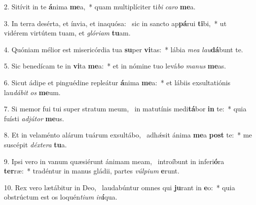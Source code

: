 2. Sitívit in te \textbf{á}nima \textbf{me}a,~*  quam multiplíciter ti\textit{bi} \textit{ca}\textit{ro} \textbf{me}a.\

3. In terra desérta, et ínvia, et inaquósa: \dag\  sic in sancto ap\textbf{pá}rui \textbf{ti}bi,~*  ut vidérem virtútem tuam, et \textit{gló}\textit{ri}\textit{am} \textbf{tu}am.\

4. Quóniam mélior est misericórdia tua \textbf{su}per \textbf{vi}tas:~*  lábia \textit{me}\textit{a} \textit{lau}\textbf{dá}bunt te.\

5. Sic benedícam te in \textbf{vi}ta \textbf{me}a:~*  et in nómine tuo levá\textit{bo} \textit{ma}\textit{nus} \textbf{me}as.\

6. Sicut ádipe et pinguédine repleátur \textbf{á}nima \textbf{me}a:~*  et lábiis exsultatiónis lau\textit{dá}\textit{bit} \textit{os} \textbf{me}um.\

7. Si memor fui tui super stratum meum, \dag\  in matutínis medi\textbf{tá}bor \textbf{in} te:~*  quia fuísti \textit{ad}\textit{jú}\textit{tor} \textbf{me}us.\

8. Et in velaménto alárum tuárum exsultábo, \dag\  adhǽsit ánima \textbf{me}a \textbf{post} te:~*  me suscépit \textit{déx}\textit{te}\textit{ra} \textbf{tu}a.\

9. Ipsi vero in vanum quæsiérunt ánimam meam, \dag\  introíbunt in inferi\textbf{ó}ra \textbf{ter}ræ:~*  tradéntur in manus gládii, partes \textit{vúl}\textit{pi}\textit{um} \textbf{e}runt.\

10. Rex vero lætábitur in Deo, \dag\  laudabúntur omnes qui \textbf{ju}rant in \textbf{e}o:~*  quia obstrúctum est os loquén\textit{ti}\textit{um} \textit{in}\textbf{í}qua.\

